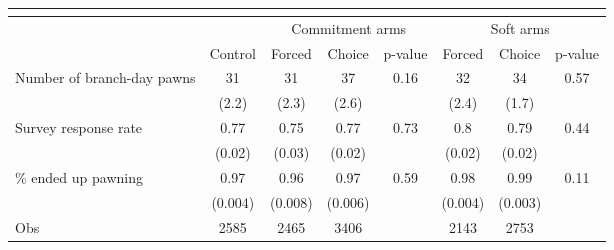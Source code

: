 \begin{tabular}{lccccccc}
\toprule
      & \multicolumn{7}{c}{} \\
\midrule
      &       & \multicolumn{3}{c}{Commitment arms} & \multicolumn{3}{c}{Soft arms} \\
\midrule
\midrule
      & Control & Forced & Choice & p-value & Forced & Choice  & p-value \\
\midrule
\midrule
Number of branch-day pawns & 31    & 31    & 37    & 0.16  & 32    & 34    & 0.57 \\
      & (2.2) & (2.3) & (2.6) &       & (2.4) & (1.7) &  \\
Survey response rate & 0.77  & 0.75  & 0.77  & 0.73  & 0.8   & 0.79  & 0.44 \\
      & (0.02) & (0.03) & (0.02) &       & (0.02) & (0.02) &  \\
\% ended up pawning & 0.97  & 0.96  & 0.97  & 0.59  & 0.98  & 0.99  & 0.11 \\
      & (0.004) & (0.008) & (0.006) &       & (0.004) & (0.003) &  \\
\midrule
Obs   & 2585  & 2465  & 3406  &       & 2143  & 2753  &  \\
\bottomrule
\bottomrule
\end{tabular}%
